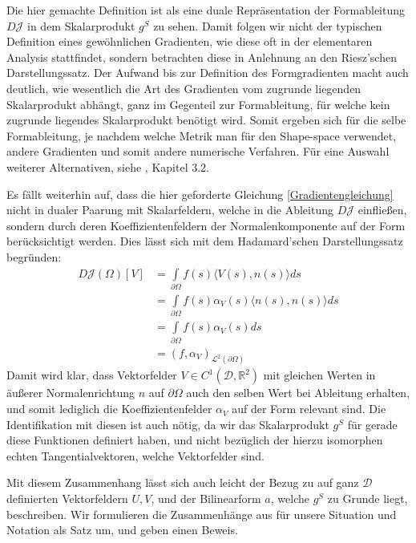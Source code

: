 Die hier gemachte Definition ist als eine duale Repräsentation der Formableitung $D\mathcal{J}$ in dem Skalarprodukt $g^S$ zu sehen. Damit folgen wir nicht der typischen Definition eines gewöhnlichen Gradienten, wie diese oft in der elementaren Analysis stattfindet, sondern betrachten diese in Anlehnung an den  Riesz'schen Darstellungssatz. Der Aufwand bis zur Definition des Formgradienten macht auch deutlich, wie wesentlich die Art des Gradienten vom zugrunde liegenden Skalarprodukt abhängt, ganz im Gegenteil zur Formableitung, für welche kein zugrunde liegendes Skalarprodukt benötigt wird. Somit ergeben sich für die selbe Formableitung, je nachdem welche Metrik man für den Shape-space verwendet, andere Gradienten und somit andere numerische Verfahren. Für eine Auswahl weiterer Alternativen, siehe \cite{shape_space}, Kapitel 3.2.

Es fällt weiterhin auf, dass die hier geforderte Gleichung \ref{Gradientengleichung} nicht in dualer Paarung mit Skalarfeldern, welche in die Ableitung $D\mathcal{J}$ einfließen, sondern durch deren Koeffizientenfeldern der Normalenkomponente auf der Form berücksichtigt werden. Dies lässt sich mit dem Hadamard'schen Darstellungssatz begründen:
\begin{align*}
	D\mathcal{J}(\Omega)[V] &= \underset{\partial\Omega}{\int}f(s)\langle V(s),n(s)\rangle ds \\
	&=\underset{\partial\Omega}{\int}f(s) \alpha_V(s)\langle n(s),n(s)\rangle ds \\
	&=\underset{\partial\Omega}{\int}f(s) \alpha_V(s) ds \\
	&= (f,\alpha_V)_{\mathcal{L}^2(\partial\Omega)}
\end{align*}
Damit wird klar, dass Vektorfelder $V\in C^1(\mathcal{D},\mathbb{R}^2)$ mit gleichen Werten in äußerer Normalenrichtung $n$ auf $\partial\Omega$ auch den selben Wert bei Ableitung erhalten, und somit lediglich die Koeffizientenfelder $\alpha_V$ auf der Form relevant sind. Die Identifikation mit diesen ist auch nötig, da wir das Skalarprodukt $g^S$ für gerade diese Funktionen definiert haben, und nicht bezüglich der hierzu isomorphen echten Tangentialvektoren, welche Vektorfelder sind.

Mit diesem Zusammenhang lässt sich auch leicht der Bezug zu auf ganz $\mathcal{D}$ definierten Vektorfeldern $U,V$, und der Bilinearform $a$, welche $g^S$ zu Grunde liegt, beschreiben. Wir formulieren die Zusammenhänge aus \cite{bfgs2} für unsere Situation und Notation als Satz um, und geben einen Beweis. 

